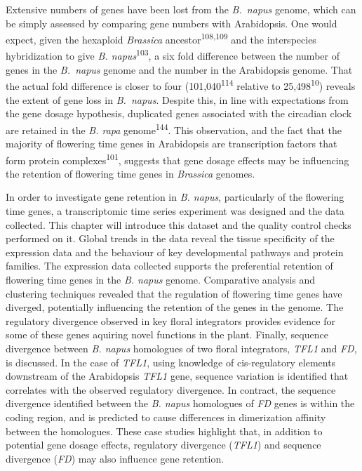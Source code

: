 \documentclass[12pt,]{book}
\begin{document}
Extensive numbers of genes have been lost from the \emph{B.~napus}
genome, which can be simply assessed by comparing gene numbers with
Arabidopsis. One would expect, given the hexaploid \emph{Brassica}
ancestor\textsuperscript{108,109} and the interspecies hybridization to
give \emph{B. napus}\textsuperscript{103}, a six fold difference between
the number of genes in the \emph{B.~napus} genome and the number in the
Arabidopsis genome. That the actual fold difference is closer to four
(101,040\textsuperscript{114} relative to 25,498\textsuperscript{10})
reveals the extent of gene loss in \emph{B.~napus}. Despite this, in
line with expectations from the gene dosage hypothesis, duplicated genes
associated with the circadian clock are retained in the \emph{B. rapa}
genome\textsuperscript{144}. This observation, and the fact that the
majority of flowering time genes in Arabidopsis are transcription
factors that form protein complexes\textsuperscript{101}, suggests that
gene dosage effects may be influencing the retention of flowering time
genes in \emph{Brassica} genomes.

In order to investigate gene retention in \emph{B. napus}, particularly
of the flowering time genes, a transcriptomic time series experiment was
designed and the data collected. This chapter will introduce this
dataset and the quality control checks performed on it. Global trends in
the data reveal the tissue specificity of the expression data and the
behaviour of key developmental pathways and protein families. The
expression data collected supports the preferential retention of
flowering time genes in the \emph{B. napus} genome. Comparative analysis
and clustering techniques revealed that the regulation of flowering time
genes have diverged, potentially influencing the retention of the genes
in the genome. The regulatory divergence observed in key floral
integrators provides evidence for some of these genes aquiring novel
functions in the plant. Finally, sequence divergence between \emph{B.
napus} homologues of two floral integrators, \emph{TFL1} and \emph{FD},
is discussed. In the case of \emph{TFL1}, using knowledge of
cis-regulatory elements downstream of the Arabidopsis \emph{TFL1} gene,
sequence variation is identified that correlates with the observed
regulatory divergence. In contract, the sequence divergence identified
between the \emph{B. napus} homologues of \emph{FD} genes is within the
coding region, and is predicted to cause differences in dimerization
affinity between the homologues. These case studies highlight that, in
addition to potential gene dosage effects, regulatory divergence
(\emph{TFL1}) and sequence divergence (\emph{FD}) may also influence
gene retention.
\end{document}
